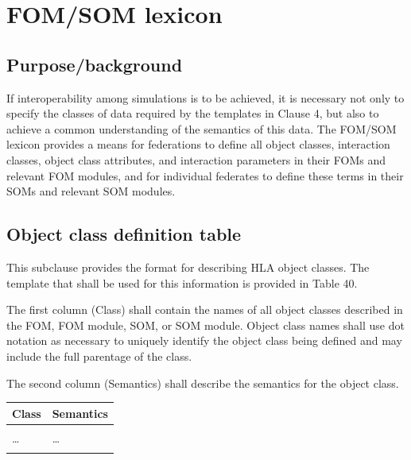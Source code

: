 \section{FOM/SOM lexicon}

\subsection{Purpose/background}
If interoperability among simulations is to be achieved, it is necessary not only to specify the classes of data required by the templates in Clause 4, but also to achieve a common understanding of the semantics of this data. The FOM/SOM lexicon provides a means for federations to define all object classes, interaction classes, object class attributes, and interaction parameters in their FOMs and relevant FOM modules, and for individual federates to define these terms in their SOMs and relevant SOM modules.

\subsection{Object class definition table}
This subclause provides the format for describing HLA object classes. The template that shall be used for this information is provided in Table 40.

The first column (Class) shall contain the names of all object classes described in the FOM, FOM module, SOM, or SOM module. Object class names shall use dot notation as necessary to uniquely identify the object class being defined and may include the full parentage of the class.

The second column (Semantics) shall describe the semantics for the object class.

\newpage
{}
\begingroup
\fontsize{8.35}{9.55}\selectfont
\setlength{\tabcolsep}{5pt}\renewcommand{\arraystretch}{1.13}
\noindent\begin{tabularx}{0.73\textwidth}{|C{145pt}|Y|}
\hline
\bfseries Class & \centering\arraybackslash\bfseries Semantics \\
\hline
{} & \centering\arraybackslash {} \\
\hline
\ldots & \centering\arraybackslash \ldots \\
\hline
{} & \centering\arraybackslash {} \\
\hline
\end{tabularx}
\endgroup

